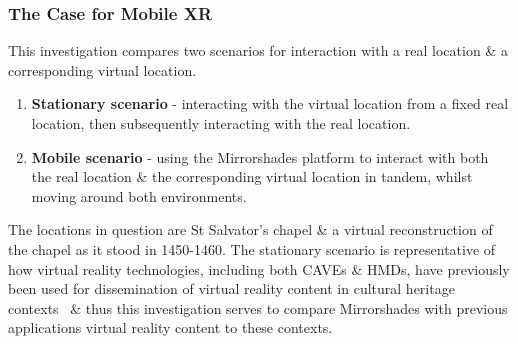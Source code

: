 
\subsubsection{The Case for Mobile XR}
This investigation compares two scenarios for interaction with a real location \& a corresponding virtual location.

\begin{enumerate}
	\item \textbf{Stationary scenario} - interacting with the virtual location from a fixed real location, then subsequently interacting with the real location.
	\item \textbf{Mobile scenario} - using the Mirrorshades platform to interact with both the real location \& the corresponding virtual location in tandem, whilst moving around both environments.
\end{enumerate}

The locations in question are St Salvator's chapel \& a virtual reconstruction of the chapel as it stood in 1450-1460. The stationary scenario is representative of how virtual reality technologies, including both CAVEs \& HMDs, have previously been used for dissemination of virtual reality content in cultural heritage contexts~\cite{Roussou2002} \& thus this investigation serves to compare Mirrorshades with previous applications virtual reality content to these contexts.

